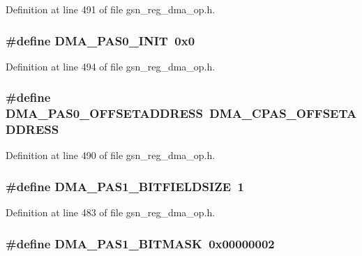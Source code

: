 Definition at line 491 of file gsn\_\-reg\_\-dma\_\-op.h.

\hypertarget{a00547_a200255c9b463780b848010247a6faacb}{
\subsubsection[{DMA\_\-PAS0\_\-INIT}]{\setlength{\rightskip}{0pt plus 5cm}\#define DMA\_\-PAS0\_\-INIT~0x0}}
\label{a00547_a200255c9b463780b848010247a6faacb}


Definition at line 494 of file gsn\_\-reg\_\-dma\_\-op.h.

\hypertarget{a00547_a7e0d3ff0470468d27f03666b5885dd0e}{
\subsubsection[{DMA\_\-PAS0\_\-OFFSETADDRESS}]{\setlength{\rightskip}{0pt plus 5cm}\#define DMA\_\-PAS0\_\-OFFSETADDRESS~DMA\_\-CPAS\_\-OFFSETADDRESS}}
\label{a00547_a7e0d3ff0470468d27f03666b5885dd0e}


Definition at line 490 of file gsn\_\-reg\_\-dma\_\-op.h.

\hypertarget{a00547_a97550444879097fc90d1688f874d3c04}{
\subsubsection[{DMA\_\-PAS1\_\-BITFIELDSIZE}]{\setlength{\rightskip}{0pt plus 5cm}\#define DMA\_\-PAS1\_\-BITFIELDSIZE~1}}
\label{a00547_a97550444879097fc90d1688f874d3c04}


Definition at line 483 of file gsn\_\-reg\_\-dma\_\-op.h.

\hypertarget{a00547_a043f8004332a35a2aa477785c156085f}{
\subsubsection[{DMA\_\-PAS1\_\-BITMASK}]{\setlength{\rightskip}{0pt plus 5cm}\#define DMA\_\-PAS1\_\-BITMASK~0x00000002}}
\label{a00547_a043f8004332a35a2aa477785c156085f}


